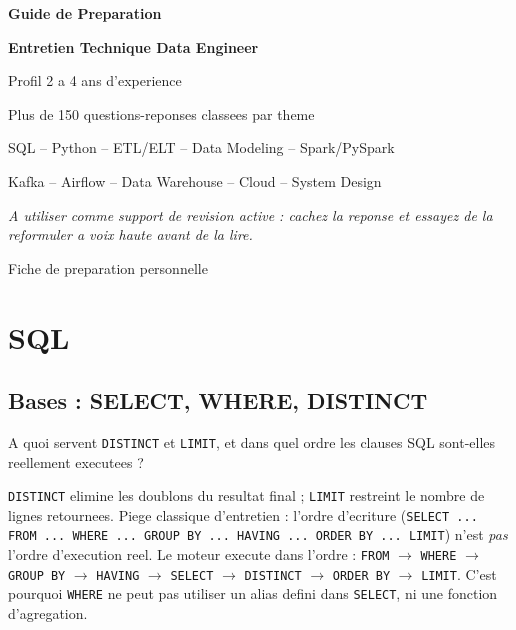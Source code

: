 \documentclass[11pt,a4paper]{article}
\begin{document}
\begin{titlepage}
  \centering
  \vspace*{2cm}
  {\Huge\bfseries\color{lakedark} Guide de Preparation\par}
  \vspace{0.5cm}
  {\LARGE\bfseries\color{lakeblue} Entretien Technique Data Engineer\par}
  \vspace{0.3cm}
  {\Large Profil 2 a 4 ans d'experience\par}
  \vspace{1.5cm}
  {\large Plus de 150 questions-reponses classees par theme\par}
  \vspace{0.3cm}
  {\large SQL -- Python -- ETL/ELT -- Data Modeling -- Spark/PySpark\par}
  {\large Kafka -- Airflow -- Data Warehouse -- Cloud -- System Design\par}
  \vfill
  {\normalsize\textit{A utiliser comme support de revision active : cachez la reponse et essayez de la reformuler a voix haute avant de la lire.}\par}
  \vspace{1cm}
  {\small Fiche de preparation personnelle\par}
\end{titlepage}

\tableofcontents
\newpage

\section{SQL}

\subsection{Bases : SELECT, WHERE, DISTINCT}

\begin{question} A quoi servent \texttt{DISTINCT} et \texttt{LIMIT}, et dans quel ordre les clauses SQL sont-elles reellement executees ?
\end{question}
\begin{reponse}
\texttt{DISTINCT} elimine les doublons du resultat final ; \texttt{LIMIT} restreint le nombre de lignes retournees. Piege classique d'entretien : l'ordre d'ecriture (\texttt{SELECT ... FROM ... WHERE ... GROUP BY ... HAVING ... ORDER BY ... LIMIT}) n'est \emph{pas} l'ordre d'execution reel. Le moteur execute dans l'ordre : \texttt{FROM} $\to$ \texttt{WHERE} $\to$ \texttt{GROUP BY} $\to$ \texttt{HAVING} $\to$ \texttt{SELECT} $\to$ \texttt{DISTINCT} $\to$ \texttt{ORDER BY} $\to$ \texttt{LIMIT}. C'est pourquoi \texttt{WHERE} ne peut pas utiliser un alias defini dans \texttt{SELECT}, ni une fonction d'agregation.
\end{reponse}
\end{document}
